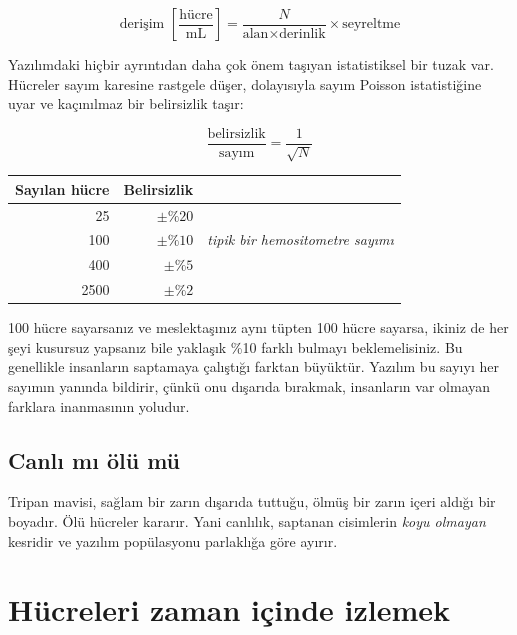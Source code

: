 \documentclass[11pt,a4paper]{article}
\begin{document}
\begin{equation}
\text{derişim }\left[\frac{\text{hücre}}{\text{mL}}\right]
=\frac{N}{\text{alan}\times\text{derinlik}}\times\text{seyreltme}
\end{equation}

Yazılımdaki hiçbir ayrıntıdan daha çok önem taşıyan istatistiksel bir tuzak var.
Hücreler sayım karesine rastgele düşer, dolayısıyla sayım Poisson istatistiğine
uyar ve kaçınılmaz bir belirsizlik taşır:

\begin{equation}
\frac{\text{belirsizlik}}{\text{sayım}}=\frac{1}{\sqrt{N}}
\end{equation}

\begin{center}\small
\begin{tabular}{rrl}
\toprule
\textbf{Sayılan hücre} & \textbf{Belirsizlik} & \\
\midrule
25 & $\pm\%20$ & \\
100 & $\pm\%10$ & \emph{tipik bir hemositometre sayımı} \\
400 & $\pm\%5$ & \\
2500 & $\pm\%2$ & \\
\bottomrule
\end{tabular}
\end{center}

\begin{plain}
100 hücre sayarsanız ve meslektaşınız aynı tüpten 100 hücre sayarsa, ikiniz de
her şeyi kusursuz yapsanız bile yaklaşık \%10 farklı bulmayı beklemelisiniz. Bu
genellikle insanların saptamaya çalıştığı farktan büyüktür. Yazılım bu sayıyı her
sayımın yanında bildirir, çünkü onu dışarıda bırakmak, insanların var olmayan
farklara inanmasının yoludur.
\end{plain}

\subsection*{Canlı mı ölü mü}

Tripan mavisi, sağlam bir zarın dışarıda tuttuğu, ölmüş bir zarın içeri aldığı
bir boyadır. Ölü hücreler kararır. Yani canlılık, saptanan cisimlerin
\emph{koyu olmayan} kesridir ve yazılım popülasyonu parlaklığa göre ayırır.

\section{Hücreleri zaman içinde izlemek}
\end{document}
